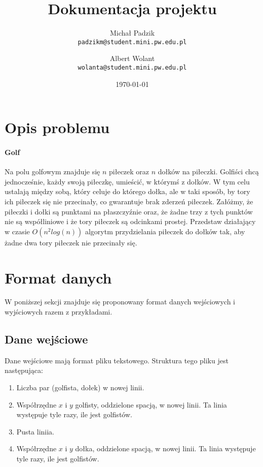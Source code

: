 \documentclass{article}
\title{Dokumentacja projektu}
\date{\today}
\author{
  Michał Padzik\\
  \texttt{padzikm@student.mini.pw.edu.pl}
  \and
  Albert Wolant\\
  \texttt{wolanta@student.mini.pw.edu.pl}
}
\begin{document}
\maketitle
{}
\newpage
{}

\section{Opis problemu}

\paragraph{Golf}
Na polu golfowym znajduje się $n$ piłeczek oraz $n$ dołków na piłeczki. Golfiści chcą jednocześnie, każdy swoją piłeczkę, umieścić, w którymś z dołków. W tym celu ustalają między sobą, który celuje do którego dołka, ale w taki sposób, by tory ich piłeczek się nie przecinały, co gwarantuje brak zderzeń piłeczek. Załóżmy, że piłeczki i dołki są punktami na płaszczyźnie oraz, że żadne trzy z tych punktów nie są współliniowe i że tory piłeczek są odcinkami prostej. Przedstaw działający w czasie $O(n^2 log( n))$ algorytm przydzielania piłeczek do dołków tak, aby żadne dwa tory piłeczek nie przecinały się.

\section{Format danych}
W poniższej sekcji znajduje się proponowany format danych wejściowych i wyjściowych razem z przykładami.

\subsection{Dane wejściowe}
Dane wejściowe mają format pliku tekstowego. Struktura tego pliku jest następująca:
\begin{enumerate}
\item Liczba par (golfista, dołek) w nowej linii.
\item Współrzędne $x$ i $y$ golfisty, oddzielone spacją, w nowej linii. Ta linia występuje tyle razy, ile jest golfistów.
\item Pusta liniia.
\item Współrzędne $x$ i $y$ dołka, oddzielone spacją, w nowej linii. Ta linia występuje tyle razy, ile jest golfistów.
\end{enumerate}
\end{document}
